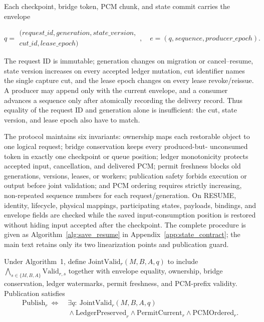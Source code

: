 \documentclass{article}
\begin{document}
Each checkpoint, bridge token, PCM chunk, and state commit carries the
envelope

\begin{equation*}
  q=\begin{gathered}\bigl(\mathit{request\_id},\mathit{generation},
     \mathit{state\_version},\\[-2pt]
     \mathit{cut\_id},\mathit{lease\_epoch}\bigr)\end{gathered},
  \quad e=(q,\mathit{sequence},\mathit{producer\_epoch}).
\end{equation*}

The request ID is immutable; generation changes on migration or
cancel--resume, state version increases on every accepted ledger mutation,
cut identifier names the single capture cut, and the lease epoch changes on
every lease revoke/reissue.  A producer may append only with the current
envelope, and a consumer advances a sequence only after atomically recording
the delivery record. Thus equality of the request ID and generation alone is insufficient:
the cut, state version, and lease epoch also have to match.

The protocol maintains six invariants: ownership maps each restorable object
to one logical request; bridge conservation keeps every produced-but-
unconsumed token in exactly one checkpoint or queue position; ledger
monotonicity protects accepted input, cancellation, and delivered PCM;
permit freshness blocks old generations, versions, leases, or workers;
publication safety forbids execution or output before joint validation; and
PCM ordering requires strictly increasing, non-repeated sequence numbers for
each request/generation.  On RESUME, identity, lifecycle, physical mappings,
participating states, payloads, bindings, and envelope fields are checked
while the saved input-consumption position is restored without hiding input
accepted after the checkpoint.  The complete procedure is given as
Algorithm~\ref{alg:save_resume} in Appendix~\ref{app:state_contract}; the
main text retains only its two linearization points and publication guard.

Under Algorithm~1, define $\mathrm{JointValid}_r(M,B,A,q)$ to include
$\bigwedge_{s\in\{M,B,A\}}\mathrm{Valid}_{r,s}$ together with envelope
equality, ownership, bridge conservation, ledger watermarks, permit
freshness, and PCM-prefix validity.  Publication satisfies
\begin{equation}
\begin{aligned}
    \mathrm{Publish}_r \ \Longleftrightarrow\;&
    \exists q:\ \mathrm{JointValid}_r(M,B,A,q) \\
    &{}\land \mathrm{LedgerPreserved}_r
    \land \mathrm{PermitCurrent}_r
    \land \mathrm{PCMOrdered}_r .
\end{aligned}
\label{eq:publish_guard}
\end{equation}
\end{document}
